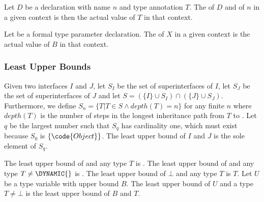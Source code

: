 \documentclass[makeidx]{article}
\begin{document}
{\LMHash{}%
Let $D$ be a declaration with name $n$ and type annotation $T$.
The  of $D$ and of $n$ in a given context is
then the actual value of $T$ in that context.


\LMHash{}%
Let  be a formal type parameter declaration.
The  of $X$ in a given context is
the actual value of $B$ in that context.



\subsubsection{Least Upper Bounds}


\LMHash{}%
Given two interfaces $I$ and $J$,
let $S_I$ be the set of superinterfaces of $I$,
let $S_J$ be the set of superinterfaces of $J$
and let $S = (\{I\} \cup S_I) \cap (\{J\} \cup S_J)$.
Furthermore,
we define $S_n = \{T | T \in S \wedge depth(T) = n\}$ for any finite $n$
where $depth(T)$ is the number of steps in the longest inheritance path
from $T$ to .
Let $q$ be the largest number such that $S_q$ has cardinality one,
which must exist because $S_0$ is $\{\code{Object}\}$.
The least upper bound of $I$ and $J$ is the sole element of $S_q$.

\LMHash{}%
The least upper bound of \DYNAMIC{} and any type $T$ is \DYNAMIC.
The least upper bound of \VOID{} and any type $T \ne \DYNAMIC{}$ is \VOID.
The least upper bound of $\bot$ and any type $T$ is $T$.
Let $U$ be a type variable with upper bound $B$.
The least upper bound of $U$ and a type $T \ne \bot$ is
the least upper bound of $B$ and $T$.

}
\end{document}
